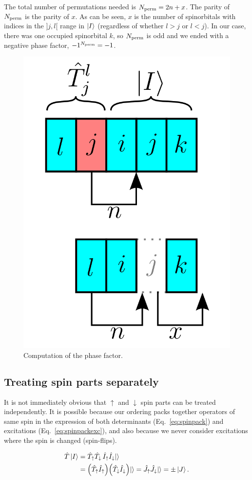\documentclass[./thesis.tex]{subfiles}
\begin{document}
The total number of permutations needed is ${N_\text{perm}} = 2n+x$. The parity of ${N_\text{perm}}$ is the parity of $x$. As can be seen, $x$ is the number of spinorbitals with indices in the $]j, l[$ range in $\ket{I}$ (regardless of whether $l>j$ or $l<j$). In our case, there was one occupied spinorbital $k$, so ${N_\text{perm}}$ is odd and we ended with a negative phase factor, $-1^{N_\text{perm}}=-1$.

\begin{figure}[h!]
	\begin{center}
		\includegraphics[width=0.25\columnwidth]{figures/determinant_driven/phasefactor}
	\end{center}
	\caption{ \label{fig:phasefactor} Computation of the phase factor.}
\end{figure}

\subsection{Treating spin parts separately}

It is not immediately obvious that $\uparrow$ and $\downarrow$ spin parts can be treated independently. It is possible because our ordering packs together operators of same spin in the expression of both determinants (Eq.~\eqref{eq:spinpack}) and excitations (Eq.~\eqref{eq:spinpackexc}), and 
also because we never consider excitations where the spin is changed (spin-flips).

\begin{align}
\label{eq:spin1}
\hat{T} \ket{I} & = \hat{T}_\uparrow \hat{T}_\downarrow \,  \hat{I}_\uparrow \hat{I}_\downarrow {\ket{}} \\
\label{eq:spin2}
            & =  \qty(\hat{T}_\uparrow \hat{I}_\uparrow) \qty(\hat{T}_\downarrow  \hat{I}_\downarrow) {\ket{}} 
              = \hat{J}_\uparrow \hat{J}_\downarrow  {\ket{}} = \pm \ket{J}.
\end{align}
\end{document}
